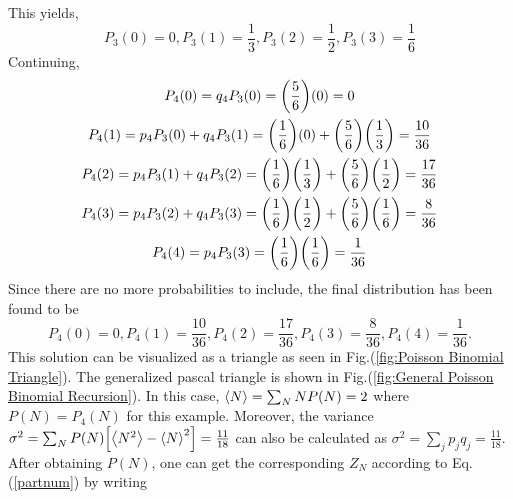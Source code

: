 This yields,
\begin{equation*}
    P_3(0)=0, P_3(1)=\frac{1}{3}, P_3(2)=\frac{1}{2}, P_3(3)=\frac{1}{6}
\end{equation*}
Continuing,
\begin{gather*}
    P_4(0)=q_4 P_3(0)=\qty(\frac{5}{6})(0)=0\\
    P_4(1)=p_4 P_{3}(0)+q_4 P_{3}(1)=\qty(\frac{1}{6})(0)+\qty(\frac{5}{6})\qty(\frac{1}{3})=\frac{10}{36}\\
    P_4(2)=p_4 P_{3}(1)+q_4 P_{3}(2)=\qty(\frac{1}{6})\qty(\frac{1}{3})+\qty(\frac{5}{6})\qty(\frac{1}{2})=\frac{17}{36}\\
    P_4(3)=p_4 P_{3}(2)+q_4 P_{3}(3)=\qty(\frac{1}{6})\qty(\frac{1}{2})+\qty(\frac{5}{6})\qty(\frac{1}{6})=\frac{8}{36}\\
    P_4(4)=p_4 P_{3}(3)=\qty(\frac{1}{6})\qty(\frac{1}{6})=\frac{1}{36}
\end{gather*}
Since there are no more probabilities to include, the final distribution has been found to be
\begin{equation*}
    P_4(0)=0, P_4(1)=\frac{10}{36}, P_4(2)=\frac{17}{36}, P_4(3)=\frac{8}{36}, P_4(4)=\frac{1}{36}.
\end{equation*}
This solution can be visualized as a triangle as seen in Fig.\@ (\ref{fig:Poisson Binomial Triangle}). 
The generalized pascal triangle is shown in Fig.\@ (\ref{fig:General Poisson Binomial Recursion}).
In this case, $\left<{N}\right>=\sum_N N P(N)=2$ where $P(N)=P_4(N)$ for this example. Moreover, the variance $\sigma^2=\sum_N P(N)\qty[\left<{N^2}\right>-\left<{N}\right>^2]=\frac{11}{18}$ can also be calculated as $\sigma^2=\sum_j p_j q_j=\frac{11}{18}$. After obtaining $P(N)$, one can get the corresponding $Z_N$ according to Eq.\@ (\ref{partnum}) by writing 
